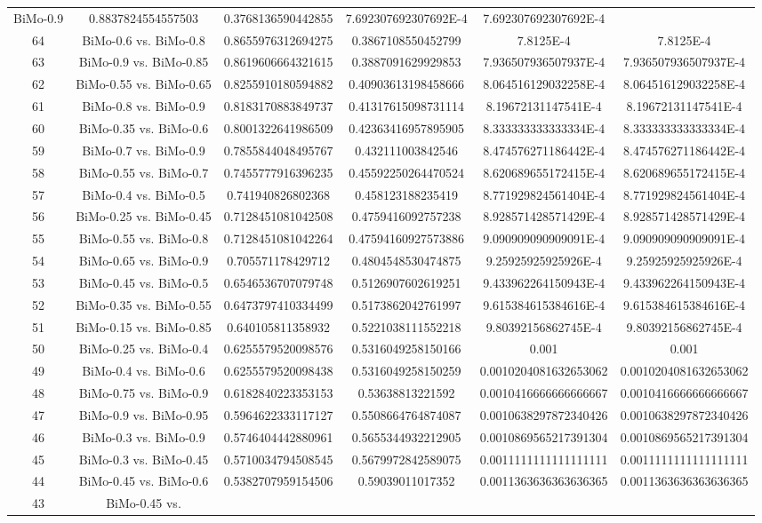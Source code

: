 \documentclass[a4paper,10pt]{article}
\begin{document}
\begin{landscape}
\begin{table}[!htp]
\begin{tabular}{cccccc}
BiMo-0.9&0.8837824554557503&0.3768136590442855&7.692307692307692E-4&7.692307692307692E-4\\64&BiMo-0.6 vs. BiMo-0.8&0.8655976312694275&0.3867108550452799&7.8125E-4&7.8125E-4\\63&BiMo-0.9 vs. BiMo-0.85&0.8619606664321615&0.3887091629929853&7.936507936507937E-4&7.936507936507937E-4\\62&BiMo-0.55 vs. BiMo-0.65&0.8255910180594882&0.40903613198458666&8.064516129032258E-4&8.064516129032258E-4\\61&BiMo-0.8 vs. BiMo-0.9&0.8183170883849737&0.41317615098731114&8.19672131147541E-4&8.19672131147541E-4\\60&BiMo-0.35 vs. BiMo-0.6&0.8001322641986509&0.42363416957895905&8.333333333333334E-4&8.333333333333334E-4\\59&BiMo-0.7 vs. BiMo-0.9&0.7855844048495767&0.432111003842546&8.474576271186442E-4&8.474576271186442E-4\\58&BiMo-0.55 vs. BiMo-0.7&0.7455777916396235&0.45592250264470524&8.620689655172415E-4&8.620689655172415E-4\\57&BiMo-0.4 vs. BiMo-0.5&0.741940826802368&0.458123188235419&8.771929824561404E-4&8.771929824561404E-4\\56&BiMo-0.25 vs. BiMo-0.45&0.7128451081042508&0.4759416092757238&8.928571428571429E-4&8.928571428571429E-4\\55&BiMo-0.55 vs. BiMo-0.8&0.7128451081042264&0.47594160927573886&9.090909090909091E-4&9.090909090909091E-4\\54&BiMo-0.65 vs. BiMo-0.9&0.705571178429712&0.4804548530474875&9.25925925925926E-4&9.25925925925926E-4\\53&BiMo-0.45 vs. BiMo-0.5&0.6546536707079748&0.5126907602619251&9.433962264150943E-4&9.433962264150943E-4\\52&BiMo-0.35 vs. BiMo-0.55&0.6473797410334499&0.5173862042761997&9.615384615384616E-4&9.615384615384616E-4\\51&BiMo-0.15 vs. BiMo-0.85&0.640105811358932&0.5221038111552218&9.80392156862745E-4&9.80392156862745E-4\\50&BiMo-0.25 vs. BiMo-0.4&0.6255579520098576&0.5316049258150166&0.001&0.001\\49&BiMo-0.4 vs. BiMo-0.6&0.6255579520098438&0.5316049258150259&0.0010204081632653062&0.0010204081632653062\\48&BiMo-0.75 vs. BiMo-0.9&0.6182840223353153&0.53638813221592&0.0010416666666666667&0.0010416666666666667\\47&BiMo-0.9 vs. BiMo-0.95&0.5964622333117127&0.5508664764874087&0.0010638297872340426&0.0010638297872340426\\46&BiMo-0.3 vs. BiMo-0.9&0.5746404442880961&0.5655344932212905&0.0010869565217391304&0.0010869565217391304\\45&BiMo-0.3 vs. BiMo-0.45&0.5710034794508545&0.5679972842589075&0.0011111111111111111&0.0011111111111111111\\44&BiMo-0.45 vs. BiMo-0.6&0.5382707959154506&0.59039011017352&0.0011363636363636365&0.0011363636363636365\\43&BiMo-0.45 vs. 
\end{tabular}
\end{table}
\end{landscape}
\end{document}
